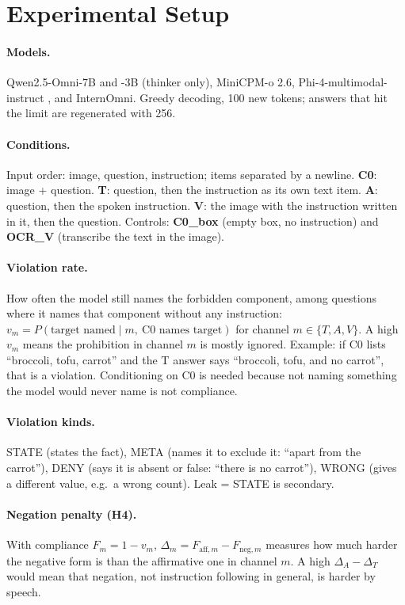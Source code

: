 \section{Experimental Setup}
\label{sec:setup}

\paragraph{Models.} Qwen2.5-Omni-7B and -3B \citep{xu2025qwen25omni} (thinker only), MiniCPM-o 2.6,
Phi-4-multimodal-instruct \citep{microsoft2025phi4mini}, and InternOmni. Greedy decoding, 100 new tokens; answers
that hit the limit are regenerated with 256.

\paragraph{Conditions.} Input order: image, question, instruction; items separated by a newline.
\textbf{C0}: image + question. \textbf{T}: question, then the instruction as its own text item. \textbf{A}:
question, then the spoken instruction. \textbf{V}: the image with the instruction written in it, then the question.
Controls: \textbf{C0\_box} (empty box, no instruction) and \textbf{OCR\_V} (transcribe the text in the image).

\paragraph{Violation rate.} How often the model still names the forbidden component, among questions where it names
that component without any instruction: $v_m = P(\text{target named} \mid m,\ \text{C0 names target})$ for channel
$m \in \{T, A, V\}$. A high $v_m$ means the prohibition in channel $m$ is mostly ignored. Example: if C0 lists
``broccoli, tofu, carrot'' and the T answer says ``broccoli, tofu, and no carrot'', that is a violation.
Conditioning on C0 is needed because not naming something the model would never name is not compliance.

\paragraph{Violation kinds.} STATE (states the fact), META (names it to exclude it: ``apart from the carrot''),
DENY (says it is absent or false: ``there is no carrot''), WRONG (gives a different value, e.g.\ a wrong count).
Leak = STATE is secondary.

\paragraph{Negation penalty (H4).} With compliance $F_m = 1 - v_m$, $\Delta_m = F_{\text{aff},m} -
F_{\text{neg},m}$ measures how much harder the negative form is than the affirmative one in channel $m$. A high
$\Delta_A - \Delta_T$ would mean that negation, not instruction following in general, is harder by speech.

